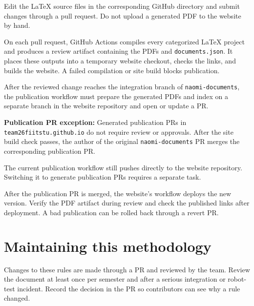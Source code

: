 \documentclass[12pt,a4paper]{article}
\newif\ifshowbibliography
\begin{document}
Edit the LaTeX source files in the corresponding GitHub directory and submit changes through a pull request. Do not upload a generated PDF to the website by hand.

On each pull request, GitHub Actions compiles every categorized \LaTeX{} project and produces a review artifact containing the PDFs and \texttt{documents.json}. It places these outputs into a temporary website checkout, checks the links, and builds the website. A failed compilation or site build blocks publication.

After the reviewed change reaches the integration branch of \texttt{naomi-documents}, the publication workflow must prepare the generated PDFs and index on a separate branch in the website repository and open or update a PR.

\textbf{Publication PR exception:}
Generated publication PRs in \texttt{team26fiitstu.github.io}
do not require review or approvals. After the site build check
passes, the author of the original \texttt{naomi-documents} PR
merges the corresponding publication PR.

The current publication workflow still pushes directly to the
website repository. Switching it to generate publication PRs
requires a separate task.

After the publication PR is merged, the website's workflow deploys the new version. Verify the PDF artifact during review and check the published links after deployment. A bad publication can be rolled back through a revert PR.

\section{Maintaining this methodology}

Changes to these rules are made through a PR and reviewed by the team. Review the document at least once per semester and after a serious integration or robot-test incident. Record the decision in the PR so contributors can see why a rule changed.

\ifshowbibliography
    \nocite{*}
    \clearpage
    \printbibliography[heading=bibintoc,title={References}]
\fi
\end{document}
